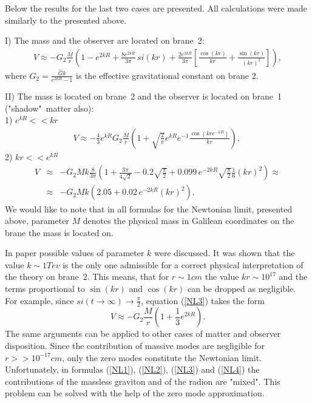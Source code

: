 \documentclass[a4paper,12pt]{article}
\begin{document}
Below the results for the last two cases are presented. All
calculations were made similarly to the presented above.

I) The mass and the observer are located on brane~2:
\begin{eqnarray}\label{NL3}
V\approx
-G_{2}\frac{M}{r}\left(1-e^{2kR}+\frac{8e^{2kR}}{3\pi}\,si(kr)+
\frac{2e^{2kR}}{3\pi}\left[\frac{\cos(kr)}{kr}+\frac{\sin(kr)}{(kr)^2}\right]\right),
\end{eqnarray}
where $G_2=\frac{\hat G k}{e^{2kR}-1}$ is the effective
gravitational constant on brane 2.

II) The mass is located on brane~2 and the observer is located on
brane~1 ("shadow"\ matter also): \\ 1) $e^{kR}<<kr$
\begin{eqnarray}\label{NL4}
V\approx
-\frac{4}{3}e^{kR}G_{2}\frac{M}{r}\left(1+\sqrt{\frac{2}{\pi}}e^{kR}e^{-1}
\frac{\cos(kre^{-kR})}{kr}\right),\,
\end{eqnarray}
2) $kr<<e^{kR}$
\begin{eqnarray}
V &\approx&
-G_{2}Mk\frac{8}{3\pi}\left(1+\frac{3\pi}{4\sqrt{2}}-0.2\sqrt{\frac{\pi}{2}}+
0.099\,
e^{-2kR}\sqrt{\frac{\pi}{2}}\frac{1}{6}(kr)^2\right)\approx
\\ \nonumber &\approx& -G_{2}Mk\left(2.05+0.02\,e^{-2kR}(kr)^2\right).\,
\end{eqnarray}
We would like to note that in all formulas for the Newtonian
limit, presented above, parameter $M$ denotes the physical mass in
Galilean coordinates on the brane the mass is  located on.

In paper \cite{BKSV} possible values of parameter $k$ were discussed. It
was shown that the value  $k\sim 1 Tev$ is the only one admissible for a
correct physical interpretation of the theory on brane~2. This means, that
for $r\sim 1cm$ the value $kr\sim 10^{17}$ and the terms proportional to
$\sin(kr)$ and $\cos(kr)$ can be dropped as negligible. For example, since
$si(t\to\infty)\to \frac{\pi}{2}$, equation (\ref{NL3}) takes the form
\begin{equation}
V\approx -G_{2}\frac{M}{r}\left(1+\frac{1}{3}e^{2kR}\right).
\end{equation}
The same arguments can be applied to other cases of matter and observer
disposition. Since the contribution of massive modes are negligible for
$r>>10^{-17} cm$, only the zero modes constitute the Newtonian limit.
Unfortunately,  in formulas (\ref{NL1}), (\ref{NL2}), (\ref{NL3}) and
(\ref{NL4}) the  contributions of the  massless graviton and of the radion
are "mixed". This problem can be solved with the help of the zero mode
approximation.
\end{document}
